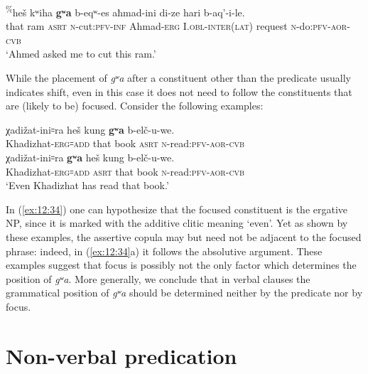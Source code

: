 ﻿\documentclass[output=paper]{langsci/langscibook}
\begin{document}
\ex \label{ex:12:33} %
\gll \textsuperscript{\%}heš kʷiha \textbf{gʷa} b-eqʷ-es aħmad-ini di-ze hari b-aq'-i-le.\\
that ram \textsc{asrt} \textsc{n}-cut:\textsc{pfv}-\textsc{inf} Ahmad-\textsc{erg} I.\textsc{obl}-\textsc{inter}(\textsc{lat}) request \textsc{n}-do:\textsc{pfv}-\textsc{aor}-\textsc{cvb}\\
\glt `Ahmed asked me to cut this ram.'
\z

While the placement of \emph{gʷa} after a constituent other than the
predicate usually indicates  shift, even in this case it does not
need to follow the constituents that are (likely to be) focused.
Consider the following examples:

\ea \label{ex:12:34} %
\ea %
\gll χadižat-ini꞊ra heš kung \textbf{gʷa} b-elč-u-we.\\
Khadizhat-\textsc{erg}꞊\textsc{add} that book \textsc{asrt} \textsc{n}-read:\textsc{pfv}-\textsc{aor}-\textsc{cvb}\\

\ex %
\gll χadižat-ini꞊ra \textbf{gʷa} heš kung b-elč-u-we.\\
Khadizhat-\textsc{erg}꞊\textsc{add} \textsc{asrt} that book \textsc{n}-read:\textsc{pfv}-\textsc{aor}-\textsc{cvb}\\
\glt `Even Khadizhat has read that book.'
\z
\z

In (\ref{ex:12:34}) one can hypothesize that the focused constituent is the ergative
NP, since it is marked with the additive clitic meaning `even'. Yet as
shown by these examples, the assertive copula may but need not be
adjacent to the focused phrase: indeed, in (\ref{ex:12:34}a) it follows the
absolutive argument. These examples suggest that focus is possibly not
the only factor which determines the position of \emph{gʷa}. More
generally, we conclude that in verbal clauses the grammatical position
of \emph{gʷa} should be determined neither by the predicate nor by focus.


\section{Non-verbal predication}\label{non-verbal-predication}
\end{document}
